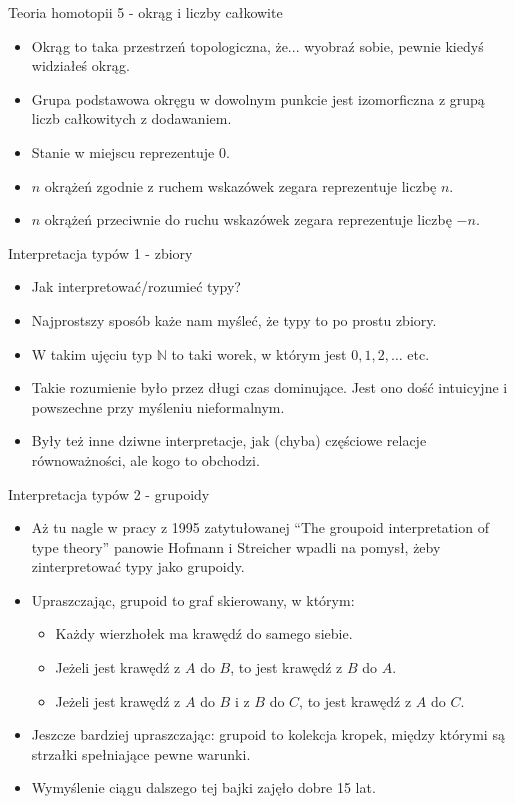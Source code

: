 \documentclass{beamer}
\begin{document}
\begin{frame}{Teoria homotopii 5 - okrąg i liczby całkowite}
\begin{itemize}
	\item Okrąg to taka przestrzeń topologiczna, że... wyobraź sobie, pewnie kiedyś widziałeś okrąg.
	\item Grupa podstawowa okręgu w dowolnym punkcie jest izomorficzna z grupą liczb całkowitych z dodawaniem.
	\item Stanie w miejscu reprezentuje $0$.
	\item $n$ okrążeń zgodnie z ruchem wskazówek zegara reprezentuje liczbę $n$.
	\item $n$ okrążeń przeciwnie do ruchu wskazówek zegara reprezentuje liczbę $-n$.
\end{itemize}
\end{frame}

\begin{frame}{Interpretacja typów 1 - zbiory}
\begin{itemize}
	\item Jak interpretować/rozumieć typy?
	\item Najprostszy sposób każe nam myśleć, że typy to po prostu zbiory.
	\item W takim ujęciu typ $\mathbb{N}$ to taki worek, w którym jest $0, 1, 2, \dots$ etc.
	\item Takie rozumienie było przez długi czas dominujące. Jest ono dość intuicyjne i powszechne przy myśleniu nieformalnym.
	\item Były też inne dziwne interpretacje, jak (chyba) częściowe relacje równoważności, ale kogo to obchodzi.
\end{itemize}
\end{frame}

\begin{frame}{Interpretacja typów 2 - grupoidy}
\begin{itemize}
	\item Aż tu nagle w pracy z 1995 zatytułowanej ``The groupoid interpretation of type theory'' panowie Hofmann i Streicher wpadli na pomysł, żeby zinterpretować typy jako grupoidy.
	\item Upraszczając, grupoid to graf skierowany, w którym:
	\begin{itemize}
		\item Każdy wierzhołek ma krawędź do samego siebie.
		\item Jeżeli jest krawędź z $A$ do $B$, to jest krawędź z $B$ do $A$.
		\item Jeżeli jest krawędź z $A$ do $B$ i z $B$ do $C$, to jest krawędź z $A$ do $C$.
	\end{itemize}
	\item Jeszcze bardziej upraszczając: grupoid to kolekcja kropek, między którymi są strzałki spełniające pewne warunki.
	\item Wymyślenie ciągu dalszego tej bajki zajęło dobre 15 lat.
\end{itemize}
\end{frame}
\end{document}
